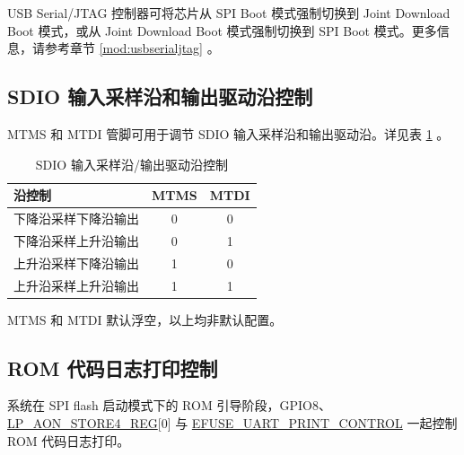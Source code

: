 \documentclass[main\_\_CN.tex]{subfiles}
\begin{document}
USB Serial/JTAG 控制器可将芯片从 SPI Boot 模式强制切换到 Joint Download Boot 模式，或从 Joint Download Boot 模式强制切换到 SPI Boot 模式。更多信息，请参考章节 \ref{mod:usbserialjtag} \textit{}。


\subsection{SDIO 输入采样沿和输出驱动沿控制}

MTMS 和 MTDI 管脚可用于调节 SDIO 输入采样沿和输出驱动沿。详见表 \ref{tab:bootctrl-sdio-input-output-edge-control} \textit{}。

\begin{table}[H]
    \centering
    \caption{SDIO 输入采样沿/输出驱动沿控制}
    \label{tab:bootctrl-sdio-input-output-edge-control}

    \begin{threeparttable}
        \begin{tabular}{ | p{4.5cm} | c | c | }
        \hline
            \rowcolor{lightgray}
            \textbf{沿控制} & \textbf{MTMS\tnote{1}} & \textbf{MTDI\tnote{1}} \\\hline
            下降沿采样下降沿输出 & 0 & 0 \\\hline
            下降沿采样上升沿输出 & 0 & 1 \\\hline
            上升沿采样下降沿输出 & 1 & 0 \\\hline
            上升沿采样上升沿输出 & 1 & 1 \\\hline
         \end{tabular}

        \begin{tablenotes}
            \item[1] MTMS 和 MTDI 默认浮空，以上均非默认配置。
        \end{tablenotes}
     \end{threeparttable}
\end{table}


\subsection{ROM 代码日志打印控制}

系统在 SPI flash 启动模式下的 ROM 引导阶段，GPIO8、\hyperref[regdesc:LPAONSTORENREG]{LP\_AON\_STORE4\_REG}[0] 与 \hyperref[fielddesc:EFUSEUARTPRINTCONTROL]{EFUSE\_UART\_PRINT\_CONTROL} 一起控制 ROM 代码日志打印。
\end{document}
